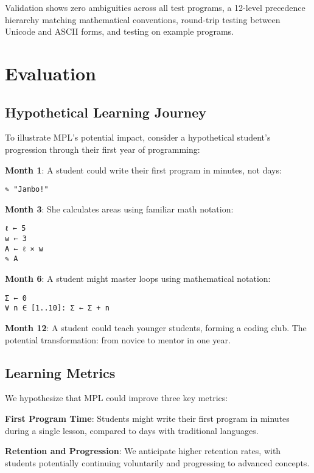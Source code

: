 \documentclass[10pt,conference]{IEEEtran}
\begin{document}
Validation shows zero ambiguities across all test programs, a 12-level precedence hierarchy matching mathematical conventions, round-trip testing between Unicode and ASCII forms, and testing on example programs.

\section{Evaluation}

\subsection{Hypothetical Learning Journey}

To illustrate MPL's potential impact, consider a hypothetical student's progression through their first year of programming:

\textbf{Month 1}: A student could write their first program in minutes, not days:
\begin{lstlisting}[language=MPL]
✎ "Jambo!"
\end{lstlisting}

\textbf{Month 3}: She calculates areas using familiar math notation:
\begin{lstlisting}[language=MPL]
ℓ ← 5
w ← 3
A ← ℓ × w
✎ A
\end{lstlisting}

\textbf{Month 6}: A student might master loops using mathematical notation:
\begin{lstlisting}[language=MPL]
Σ ← 0
∀ n ∈ [1..10]: Σ ← Σ + n
\end{lstlisting}

\textbf{Month 12}: A student could teach younger students, forming a coding club. The potential transformation: from novice to mentor in one year.

\subsection{Learning Metrics}

We hypothesize that MPL could improve three key metrics:

\textbf{First Program Time}: Students might write their first program in minutes during a single lesson, compared to days with traditional languages.

\textbf{Retention and Progression}: We anticipate higher retention rates, with students potentially continuing voluntarily and progressing to advanced concepts.
\end{document}
